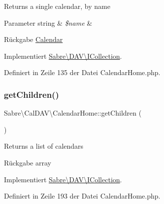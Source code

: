 Returns a single calendar, by name


\begin{DoxyParams}[1]{Parameter}
string & {\em \$name} & \\
\hline
\end{DoxyParams}
\begin{DoxyReturn}{Rückgabe}
\mbox{\hyperlink{class_sabre_1_1_cal_d_a_v_1_1_calendar}{Calendar}} 
\end{DoxyReturn}


Implementiert \mbox{\hyperlink{interface_sabre_1_1_d_a_v_1_1_i_collection_a09f82b07550611752abb149f468b89c2}{Sabre\textbackslash{}\+D\+A\+V\textbackslash{}\+I\+Collection}}.



Definiert in Zeile 135 der Datei Calendar\+Home.\+php.

\mbox{\label{class_sabre_1_1_cal_d_a_v_1_1_calendar_home_aa97108e2047c34a8d17ee6bbac1f4e67}} 
\subsubsection{\texorpdfstring{get\+Children()}{getChildren()}}
{\footnotesize\ttfamily Sabre\textbackslash{}\+Cal\+D\+A\+V\textbackslash{}\+Calendar\+Home\+::get\+Children (\begin{DoxyParamCaption}{ }\end{DoxyParamCaption})}

Returns a list of calendars

\begin{DoxyReturn}{Rückgabe}
array 
\end{DoxyReturn}


Implementiert \mbox{\hyperlink{interface_sabre_1_1_d_a_v_1_1_i_collection_a5344a6890e49fd7a81bb0e38b4c6d0be}{Sabre\textbackslash{}\+D\+A\+V\textbackslash{}\+I\+Collection}}.



Definiert in Zeile 193 der Datei Calendar\+Home.\+php.

\mbox{\label{class_sabre_1_1_cal_d_a_v_1_1_calendar_home_a0dfbe0749f15d71d6596e83aa49fc776}} 
